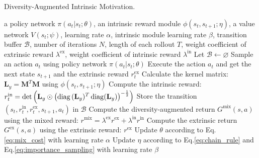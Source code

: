 \begin{algorithm}[t]
	\caption{\label{alg:all} Diversity-Augmented Intrinsic Motivation.
	}
	\begin{algorithmic}[1]
		\REQUIRE a policy network $\pi(a_{t}|s_{t};\theta)$, an intrinsic reward module $\phi(s_{t},s_{t+1};\eta)$, a value network $V(s_{t};\psi)$, learning rate $\alpha$, intrinsic module learning rate $\beta$, transition buffer $\mathcal{B}$, number of iterations $N$, length of each rollout $T$, weight coefficient of extrinsic reward $\lambda^{\text{ex}}$, weight coefficient of intrinsic reward $\lambda^{\text{in}}$
		\STATE Let $\mathcal{B} \leftarrow \varnothing$
        \STATE Sample an action $a_{t}$ using policy network $\pi(a_{t}|s_{t};\theta)$
        \STATE Execute the action $a_{t}$ and get the next state $s_{t+1}$ and the extrinsic reward $r^{\text{ex}}_{t}$
		\STATE Calculate the kernel matrix: $\textbf{L}_{y}=\mathbf{M}^{T}\mathbf{M}$ using $\phi(s_{t},s_{t+1};\eta)$
		\STATE Compute the intrinsic reward: $r_{t}^{\text{in}} = \det\left(\mathbf{L}_{y} \odot \left(\operatorname{diag}{(\mathbf{L}_{y}})^{T}\operatorname{diag}({\mathbf{L}_{y}})\right)^{-\frac{1}{2}}\right)$
		\STATE Store the transition $(s_{t}, r^{\text{in}}_{t}, r^{\text{ex}}_{t}, s_{t+1}, a_{t})$ in $\mathcal{B}$
		\ENDFOR
		\STATE Compute the diversity-augmented return $G^{\text{mix}}(s, a)$ using the mixed reward: $r^{\text{mix}}=\lambda^{\text{ex}}r^{\text{ex}} + \lambda^{\text{in}}r^{\text{in}}$
		\STATE Compute the extrinsic return $G^{\text{ex}}(s, a)$ using the extrinsic reward: $r^{\text{ex}}$
		\STATE Update $\theta$ according to Eq.\eqref{eq:mix_cost} with learning rate $\alpha$
		\STATE{}
		\STATE Update $\eta$ according to Eq.\eqref{eq:chain_rule} and Eq.\eqref{eq:importance_sampling} with learning rate $\beta$
        \ENDFOR
	\end{algorithmic}
	\label{algo:vi}
\end{algorithm}

